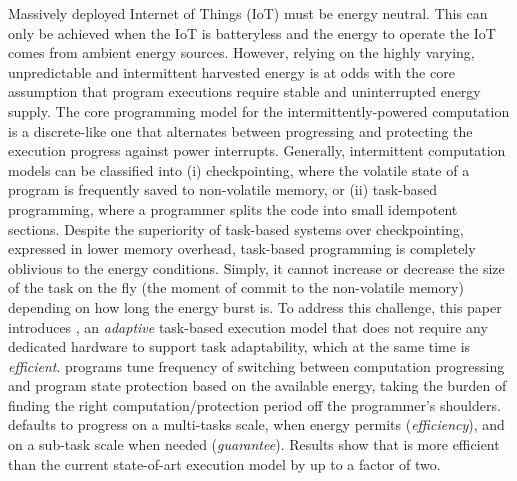 Massively deployed Internet of Things (IoT) must be energy neutral. This can only be achieved when the IoT is batteryless and the energy to operate the IoT comes from ambient energy sources.
However, relying on the highly varying, unpredictable and intermittent harvested energy is at odds with the core assumption that program executions require stable and uninterrupted energy supply. 
The core programming model for the intermittently-powered computation is a discrete-like one that alternates between progressing and protecting the execution progress against power interrupts.
Generally, intermittent computation models can be classified into (i) checkpointing, where the volatile state of a program is frequently saved to non-volatile memory, or (ii) task-based programming, where a programmer splits the code into small idempotent sections. Despite the superiority of task-based systems over checkpointing, expressed in lower memory overhead, task-based programming is completely oblivious to the energy conditions. Simply, it cannot increase or decrease the size of the task on the fly (the moment of commit to the non-volatile memory) depending on how long the energy burst is. 
To address this challenge, this paper introduces \sys, an \emph{adaptive} task-based execution model that does not require any dedicated hardware to support task adaptability, which at the same time is \emph{efficient}.
\sys programs tune frequency of switching between computation progressing and program state protection based on the available energy, taking the burden of finding the right computation/protection period off the programmer's shoulders.
\sys defaults to progress on a multi-tasks scale, when energy permits (\emph{efficiency}), and on a sub-task scale when needed (\emph{guarantee}).
Results show that \sys is more efficient than the current state-of-art execution model by up to a factor of two.

